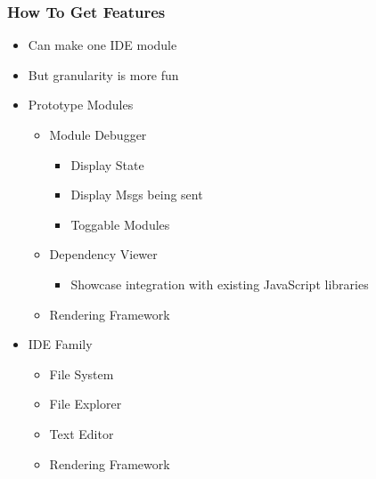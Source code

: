 \documentclass{beamer}
\begin{document}
\showlogo
\begin{frame}
  \frametitle{How To Get Features}
  \begin{itemize}
    \item Can make one IDE module
    \item But granularity is more fun 
    \item Prototype Modules
      \begin{itemize}
        \item Module Debugger
          \begin{itemize}
            \item Display State
            \item Display Msgs being sent
            \item Toggable Modules
          \end{itemize}
        \item Dependency Viewer
          \begin{itemize}
            \item Showcase integration with existing JavaScript libraries
          \end{itemize}
        \item Rendering Framework
      \end{itemize}
    \item IDE Family
      \begin{itemize}
        \item File System
        \item File Explorer
        \item Text Editor
        \item Rendering Framework
      \end{itemize}
  \end{itemize}
\end{frame}
\end{document}
